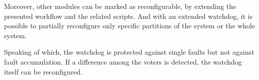 Moreover, other modules can be marked as reconfigurable, by extending the presented workflow and the related scripts. And with an extended watchdog, it is possible to partially reconfigure only specific partitions of the system or the whole system. \bigskip

Speaking of which, the watchdog is protected against single faults but not against fault accumulation. If a difference among the voters is detected, the watchdog itself can be reconfigured.  



